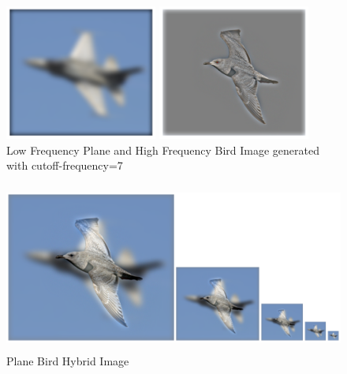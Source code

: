 \documentclass[12pt]{report}
\begin{document}
\begin{figure}[H]
    \centering
    \begin{minipage}{0.45\textwidth}
            \centering
            \includegraphics[height=12em]{./images/plane_low.png}
        \end{minipage}
        \begin{minipage}{0.45\textwidth}
            \centering
            \includegraphics[height=12em]{./images/bird_high.png}
        \end{minipage}
        \caption{Low Frequency Plane and High Frequency Bird Image generated with cutoff-frequency=7}
        \label{plane_bird_low_high}
\end{figure}
\begin{figure}[H]
    \centering
        \includegraphics[height=15em]{./images/plane_bird_hybrid.png}
        \caption{Plane Bird Hybrid Image}
        \label{plane_bird_hybrid}
\end{figure}
\end{document}
